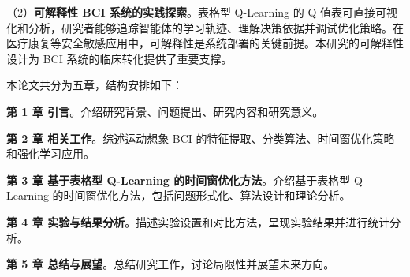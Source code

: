 （2）\textbf{可解释性 BCI 系统的实践探索}。表格型 Q-Learning 的 Q 值表可直接可视化和分析，研究者能够追踪智能体的学习轨迹、理解决策依据并调试优化策略。在医疗康复等安全敏感应用中，可解释性是系统部署的关键前提。本研究的可解释性设计为 BCI 系统的临床转化提供了重要支撑。

\label{sec:thesis_structure}

本论文共分为五章，结构安排如下：

\textbf{第 1 章 引言}。介绍研究背景、问题提出、研究内容和研究意义。

\textbf{第 2 章 相关工作}。综述运动想象 BCI 的特征提取、分类算法、时间窗优化策略和强化学习应用。

\textbf{第 3 章 基于表格型 Q-Learning 的时间窗优化方法}。介绍基于表格型 Q-Learning 的时间窗优化方法，包括问题形式化、算法设计和理论分析。

\textbf{第 4 章 实验与结果分析}。描述实验设置和对比方法，呈现实验结果并进行统计分析。

\textbf{第 5 章 总结与展望}。总结研究工作，讨论局限性并展望未来方向。


